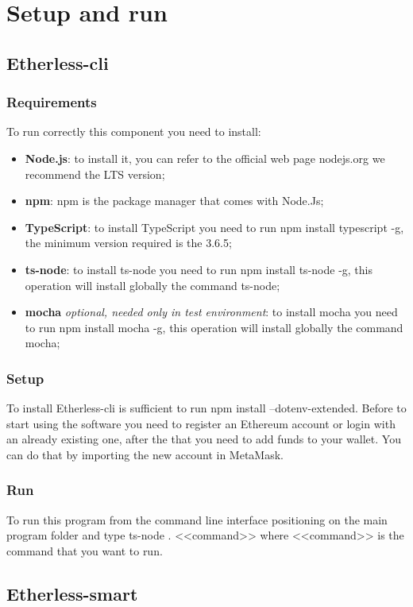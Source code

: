 \section{Setup and run}
\subsection{Etherless-cli}
\subsubsection{Requirements}
To run correctly this component you need to install:
\begin{itemize}
    \item \textbf{Node.js}: to install it, you can refer to the official web page nodejs.org we recommend the LTS version;
    \item \textbf{npm}: npm is the package manager that comes with Node.Js;
    \item \textbf{TypeScript}: to install TypeScript you need to run npm install typescript -g, the minimum version required is the 3.6.5;
    \item \textbf{ts-node}: to install ts-node you need to run npm install ts-node -g, this operation will install globally the command ts-node;
    \item \textbf{mocha} \textit{optional, needed only in test environment}: to install mocha you need to run npm install mocha -g, this operation will install globally the command mocha;
\end{itemize}

\subsubsection{Setup}
To install Etherless-cli is sufficient to run npm install --dotenv-extended.
Before to start using the software you need to register an Ethereum account or login with an already existing one, after the that you need to add funds to your wallet.
You can do that by importing the new account in MetaMask.
\subsubsection{Run}
To run this program from the command line interface positioning on the main program folder
and type ts-node . <<command>> where <<command>> is the command that you want to run.
\subsection{Etherless-smart}
